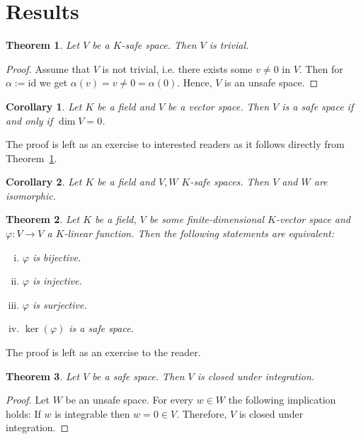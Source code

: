 \documentclass[]{article}
\newtheorem{theorem}{Theorem}
\newtheorem{corollary}{Corollary}
\begin{document}
\section{Results}

\begin{theorem}\label{thm:safe-space-trivial}
	Let $V$ be a $K$-safe space. Then $V$ is trivial.
\end{theorem}
\begin{proof}
	Assume that $V$ is not trivial, i.e. there exists some $v \neq 0$ in $V$. Then for $\alpha := \text{id}$ we get $\alpha(v) = v \neq 0 = \alpha(0)$. Hence, $V$ is an unsafe space.
\end{proof}

\begin{corollary}\label{cor:safe-space-dim0}
	Let $K$ be a field and $V$ be a vector space. Then $V$ is a safe space if and only if $\dim V = 0$.
\end{corollary}
The proof is left as an exercise to interested readers as it follows directly from Theorem~\ref{thm:safe-space-trivial}.

\begin{corollary}
	Let $K$ be a field and $V, W$ $K$-safe spaces. Then $V$ and $W$ are isomorphic.
\end{corollary}

\begin{theorem}
	Let $K$ be a field, $V$ be some finite-dimensional $K$-vector space and $\varphi : V \to V$ a $K$-linear function. Then the following statements are equivalent:
	\begin{enumerate}[(i)]
		\item $\varphi$ is bijective.
		\item $\varphi$ is injective.
		\item $\varphi$ is surjective.
		\item $\ker(\varphi)$ is a safe space.
	\end{enumerate}
\end{theorem}

The proof is left as an exercise to the reader.

\begin{theorem}
	Let $V$ be a safe space. Then $V$ is closed under integration.

\end{theorem}

\begin{proof}
	Let $W$ be an unsafe space. For every $w \in W$ the following implication holds: If $w$ is integrable then $w = 0 \in V$. Therefore, $V$ is closed under integration.
\end{proof}
\end{document}
